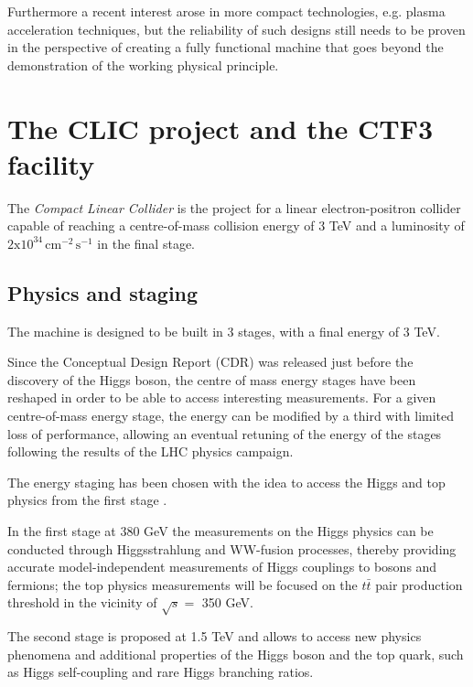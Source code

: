 Furthermore a recent interest arose in more compact technologies, e.g. plasma acceleration techniques, but the reliability of such designs still needs to be proven in the perspective of creating a fully functional machine that goes beyond the demonstration of the working physical principle.



\section{The CLIC project and the CTF3 facility}

The \textit{Compact Linear Collider} is the project for a linear electron-positron collider capable of reaching a centre-of-mass collision energy of 3 TeV and a luminosity of $2\text{x}10^{34} \, \text{cm}^{-2} \, \text{s}^{-1}$ in the final stage.

\subsection{Physics and staging}

The machine is designed to be built in 3 stages, with a final energy of 3 TeV. 

Since the Conceptual Design Report (CDR)\cite{CLIC:cdr} was released just before the discovery of the Higgs boson, the centre of mass energy stages have been reshaped in order to be able to access interesting measurements. For a given centre-of-mass energy stage, the energy can be modified by a third with limited loss of performance\cite{CLIC:cdrVol3}, allowing an eventual retuning of the energy of the stages following the results of the LHC physics campaign.

The energy staging has been chosen with the idea to access the Higgs and top physics from the first stage \cite{CLIC:staging2016,Bozovic-Jelisavcic:2160172}.

In the first stage at 380 GeV the measurements on the Higgs physics can be conducted through Higgsstrahlung and WW-fusion processes, thereby providing accurate model-independent measurements of Higgs couplings to bosons and fermions\cite{Roloff:2210491}; the top physics measurements will be focused on the $t\bar{t}$ pair production threshold in the vicinity of $\sqrt{s} = $ 350 GeV.

The second stage is proposed at 1.5 TeV and allows to access new physics phenomena and additional properties of the Higgs boson and the top quark, such as Higgs self-coupling and rare Higgs branching ratios.

